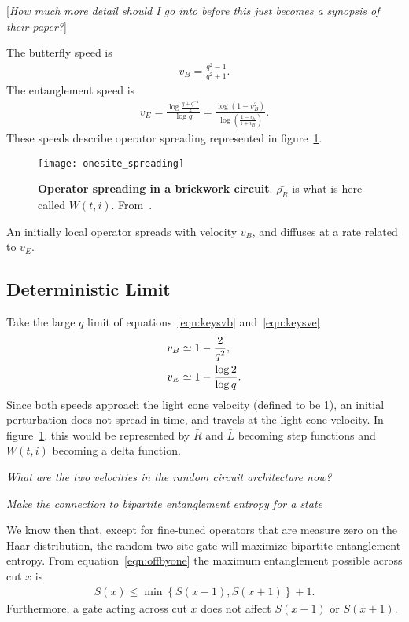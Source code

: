 [\emph{How much more detail should I go into before this just becomes a synopsis of their paper?}]

The butterfly speed is
\begin{align}
v_B= \frac{q^2-1}{q^2+1}. \label{eqn:keysvb}
\end{align}
The entanglement speed is 
\begin{align}
v_E = \frac{\log\frac{q+q^{-1}}{2}}{\log q} = \frac{\log\left(1-v_B^2
	\right)}{\log\left(\frac{1-v_b}{1+v_B}\right)}.\label{eqn:keysve}
\end{align}
These speeds describe operator spreading represented in figure~\ref{fig:onesite_spreading}.
\begin{figure}
	\centering
	\texttt{[image: onesite\_spreading]}
	\caption{\textbf{Operator spreading in a brickwork circuit}. $\bar{\rho_R}$ is what is here called $W(t,i)$. From~\cite{Keyserlingk}.}
	\label{fig:onesite_spreading}
\end{figure}
An initially local operator spreads with velocity $v_B$, and diffuses at a rate related to $v_E$. 

\subsection{Deterministic Limit}  \label{sub:determ}

Take the large $q$ limit of equations~\ref{eqn:keysvb} and~\ref{eqn:keysve}
\begin{align}
v_B &\simeq 1-\frac{2}{q^2},\nonumber\\
v_E &\simeq 1-\frac{\log 2}{\log q}.
\end{align}
Since both speeds approach the light cone velocity (defined to be 1), an initial perturbation does not spread in time, and travels at the light cone velocity. In figure~\ref{fig:onesite_spreading}, this would be represented by $\bar{R}$ and $\bar{L}$ becoming step functions and $W(t,i)$ becoming a delta function.

\emph{What are the two velocities in the random circuit architecture now?}

\emph{Make the connection to bipartite entanglement entropy for a state}

We know then that, except for fine-tuned operators that are measure zero on the Haar distribution, the random two-site gate will maximize bipartite entanglement entropy. From equation~\ref{eqn:offbyone} the maximum entanglement possible across cut $x$ is 
\begin{align}
S(x) \le \min\left\lbrace S(x-1), S(x+1)\right\rbrace + 1. \nonumber
\end{align}
Furthermore, a gate acting across cut $x$ does not affect $S(x-1)$ or $S(x+1)$.

